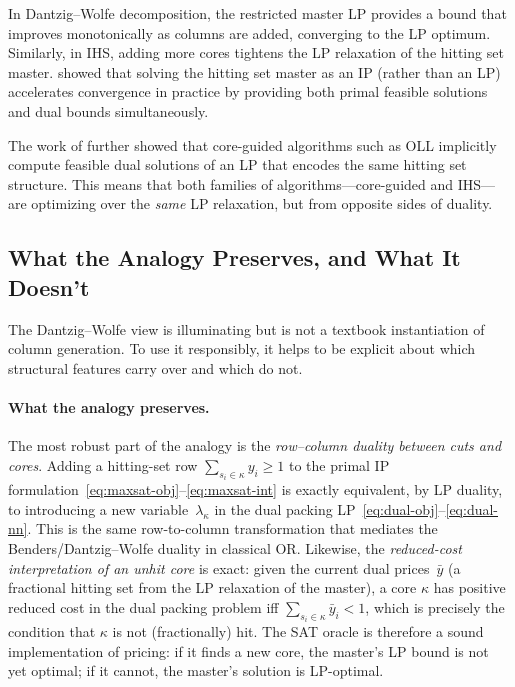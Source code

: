 \documentclass[11pt,a4paper]{article}
\begin{document}
In Dantzig--Wolfe decomposition, the restricted master LP provides a bound
that improves monotonically as columns are added, converging to the LP
optimum. Similarly, in IHS, adding more cores tightens the LP relaxation of
the hitting set master. \citet{davies2013exploiting} showed that solving the
hitting set master as an IP (rather than an LP) accelerates convergence
in practice by providing both primal feasible solutions and dual bounds
simultaneously.

The work of \citet{katsirelos2023analysis} further showed that core-guided
algorithms such as OLL implicitly compute feasible dual solutions of an LP
that encodes the same hitting set structure. This means that both families
of algorithms---core-guided and IHS---are optimizing over the \emph{same}
LP relaxation, but from opposite sides of duality.

\subsection{What the Analogy Preserves, and What It Doesn't}
\label{sec:preserves}

The Dantzig--Wolfe view is illuminating but is not a textbook instantiation
of column generation. To use it responsibly, it helps to be explicit about
which structural features carry over and which do not.

\paragraph{What the analogy preserves.} The most robust part of the analogy
is the \emph{row--column duality between cuts and cores}. Adding a hitting-set
row $\sum_{s_i \in \kappa} y_i \geq 1$ to the primal IP
formulation~\eqref{eq:maxsat-obj}--\eqref{eq:maxsat-int} is exactly equivalent,
by LP duality, to introducing a new variable~$\lambda_\kappa$ in the dual
packing LP~\eqref{eq:dual-obj}--\eqref{eq:dual-nn}. This is the same
row-to-column transformation that mediates the Benders/Dantzig--Wolfe duality
in classical OR. Likewise, the \emph{reduced-cost interpretation of an unhit
core} is exact: given the current dual prices~$\bar{y}$ (a fractional hitting
set from the LP relaxation of the master), a core $\kappa$ has positive
reduced cost in the dual packing problem iff
$\sum_{s_i \in \kappa} \bar{y}_i < 1$, which is precisely the condition that
$\kappa$ is not (fractionally) hit. The SAT oracle is therefore a sound
implementation of pricing: if it finds a new core, the master's LP bound is
not yet optimal; if it cannot, the master's solution is LP-optimal.
\end{document}
